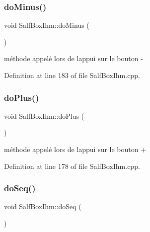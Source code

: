 \subsubsection{\texorpdfstring{do\+Minus()}{doMinus()}}
{\footnotesize\ttfamily void Salf\+Box\+Ihm\+::do\+Minus (\begin{DoxyParamCaption}{ }\end{DoxyParamCaption})\hspace{0.3cm}{\ttfamily [static]}}



méthode appelé lors de l\textquotesingle{}appui sur le bouton -\/ 



Definition at line 183 of file Salf\+Box\+Ihm.\+cpp.

\mbox{\label{class_salf_box_ihm_a8501840e90de2416c2a66a60566d8d59}} 
\subsubsection{\texorpdfstring{do\+Plus()}{doPlus()}}
{\footnotesize\ttfamily void Salf\+Box\+Ihm\+::do\+Plus (\begin{DoxyParamCaption}{ }\end{DoxyParamCaption})\hspace{0.3cm}{\ttfamily [static]}}



méthode appelé lors de l\textquotesingle{}appui sur le bouton + 



Definition at line 178 of file Salf\+Box\+Ihm.\+cpp.

\mbox{\label{class_salf_box_ihm_a1ad2fe50aaa00fecd8eb29cd605c91e4}} 
\subsubsection{\texorpdfstring{do\+Seq()}{doSeq()}}
{\footnotesize\ttfamily void Salf\+Box\+Ihm\+::do\+Seq (\begin{DoxyParamCaption}{ }\end{DoxyParamCaption})\hspace{0.3cm}{\ttfamily [static]}}



